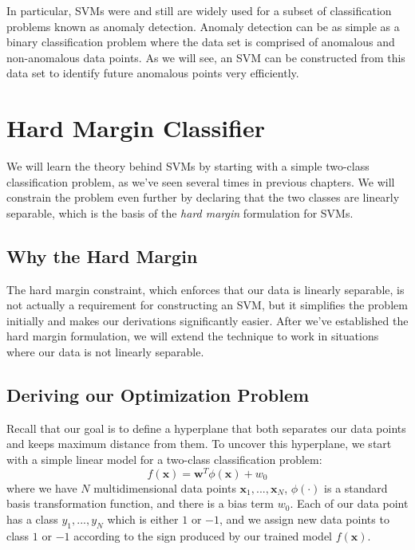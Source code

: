 In particular, SVMs were and still are widely used for a subset of classification problems known as anomaly detection.
Anomaly detection can be as simple as a binary classification problem where the data set is comprised of anomalous and non-anomalous data points. As we will see, an SVM can be constructed from this data set to identify future anomalous points very efficiently.

\section{Hard Margin Classifier}
We will learn the theory behind SVMs by starting with a simple two-class classification problem, as we've seen several times in previous chapters. We will constrain the problem even further by declaring that the two classes are linearly separable, which is the basis of the \textit{hard margin} formulation for SVMs.


\subsection{Why the Hard Margin}
The hard margin constraint, which enforces that our data is linearly separable, is not actually a requirement for constructing an SVM, but it simplifies the problem initially and makes our derivations significantly easier. After we've established the hard margin formulation, we will extend the technique to work in situations where our data is not linearly separable.

\subsection{Deriving our Optimization Problem}
Recall that our goal is to define a hyperplane that both separates our data points and keeps maximum distance from them. To uncover this hyperplane, we start with a simple linear model for a two-class classification problem:
\begin{equation} \label{classification-fn}
f(\textbf{x}) = \textbf{w}^{T}\phi(\textbf{x}) + w_{0}
\end{equation}
where we have $N$ multidimensional data points $\textbf{x}_{1}, ..., \textbf{x}_{N}$, $\phi(\cdot)$ is a standard basis transformation function, and there is a bias term $w_{0}$. Each of our data point has a class $y_{1}, ..., y_{N}$ which is either $1$ or $-1$, and we assign new data points to class $1$ or $-1$ according to the sign produced by our trained model $f(\textbf{x})$.

